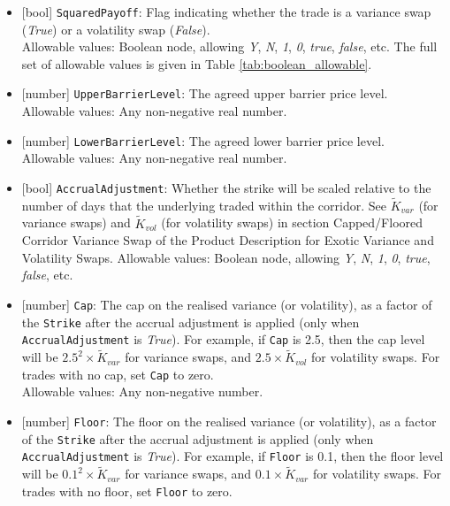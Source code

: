 \begin{itemize}
  Allowable values: See Section \ref{ss:schedule_data}.
  \item{}[bool] \lstinline!SquaredPayoff!: Flag indicating whether the trade is a variance swap (\emph{True}) or a volatility
  swap (\emph{False}). \\
  Allowable values: Boolean node, allowing \emph{Y}, \emph{N}, \emph{1}, \emph{0}, \emph{true}, \emph{false}, etc.
  The full set of allowable values is given in Table \ref{tab:boolean_allowable}.
  \item{}[number] \lstinline!UpperBarrierLevel!: The agreed upper barrier price level. \\
  Allowable values: Any non-negative real number.
  \item{}[number] \lstinline!LowerBarrierLevel!: The agreed lower barrier price level. \\
  Allowable values: Any non-negative real number.
  \item{}[bool] \lstinline!AccrualAdjustment!: Whether the strike will be scaled relative to the number of days that the
  underlying traded within the corridor. See $\widetilde{K}_{var}$ (for variance swaps) and $\widetilde{K}_{vol}$
  (for volatility swaps) in section Capped/Floored Corridor Variance Swap of the Product Description for
  Exotic Variance and Volatility Swaps.
  Allowable values: Boolean node, allowing \emph{Y}, \emph{N}, \emph{1}, \emph{0}, \emph{true}, \emph{false}, etc.
  \item{}[number] \lstinline!Cap!: The cap on the realised variance (or volatility), as a factor of the \lstinline!Strike! after
  the accrual adjustment is applied (only when \lstinline!AccrualAdjustment! is \emph{True}). For example,
  if \lstinline!Cap! is 2.5, then the cap level will be $2.5^2 \times \widetilde{K}_{var}$ for variance swaps, and
  $2.5 \times \widetilde{K}_{vol}$ for volatility swaps. For trades with no cap, set \lstinline!Cap! to zero. \\
  Allowable values: Any non-negative number.
  \item{}[number] \lstinline!Floor!: The floor on the realised variance (or volatility), as a factor of the \lstinline!Strike! after
  the accrual adjustment is applied (only when \lstinline!AccrualAdjustment! is \emph{True}). For example,
  if \lstinline!Floor! is 0.1, then the floor level will be $0.1^2 \times \widetilde{K}_{var}$ for variance swaps, and
  $0.1 \times \widetilde{K}_{var}$ for volatility swaps. For trades with no floor, set
  \lstinline!Floor! to zero. \\

\end{itemize}

